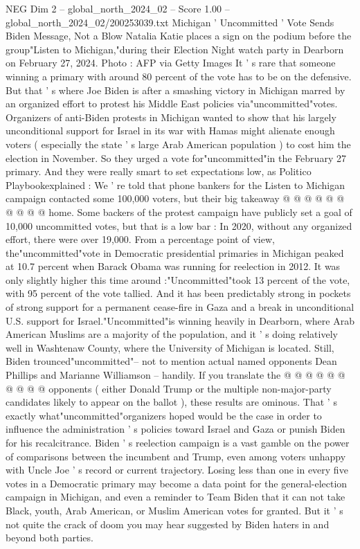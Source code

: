 \begin{textsample}{NEG Dim 2 – global\_north\_2024\_02 – Score 1.00 – global\_north\_2024\_02/200253039.txt}  \label{ex:f2_neg_179}
Michigan ' Uncommitted ' Vote Sends Biden Message, Not a Blow Natalia Katie places a sign on the podium before the group"Listen to Michigan,"during their Election Night watch party in Dearborn on February 27, 2024.
Photo : AFP via Getty Images It ' s rare that someone winning a primary with around 80 percent of the vote has to be on the defensive.
But that ' s where Joe Biden is after a smashing victory in Michigan marred by an organized effort to protest his Middle East policies via"uncommitted"votes.
Organizers of anti-Biden protests in Michigan wanted to show that his largely unconditional support for Israel in its war with Hamas might alienate enough voters ( especially the state ' s large Arab American population ) to cost him the election in November.
So they urged a vote for"uncommitted"in the February 27 primary.
And they were really smart to set expectations low, as Politico Playbookexplained : We ' re told that phone bankers for the Listen to Michigan campaign contacted some 100,000 voters, but their big takeaway @ @ @ @ @ @ @ @ @ @ home.
Some backers of the protest campaign have publicly set a goal of 10,000 uncommitted votes, but that is a low bar : In 2020, without any organized effort, there were over 19,000.
From a percentage point of view, the"uncommitted"vote in Democratic presidential primaries in Michigan peaked at 10.7 percent when Barack Obama was running for reelection in 2012.
It was only slightly higher this time around :"Uncommitted"took 13 percent of the vote, with 95 percent of the vote tallied.
And it has been predictably strong in pockets of strong support for a permanent cease-fire in Gaza and a break in unconditional U.S. support for Israel."Uncommitted"is winning heavily in Dearborn, where Arab American Muslims are a majority of the population, and it ' s doing relatively well in Washtenaw County, where the University of Michigan is located.
Still, Biden trounced"uncommitted"-- not to mention actual named opponents Dean Phillips and Marianne Williamson -- handily.
If you translate the @ @ @ @ @ @ @ @ @ @ opponents ( either Donald Trump or the multiple non-major-party candidates likely to appear on the ballot ), these results are ominous.
That ' s exactly what"uncommitted"organizers hoped would be the case in order to influence the administration ' s policies toward Israel and Gaza or punish Biden for his recalcitrance.
Biden ' s reelection campaign is a vast gamble on the power of comparisons between the incumbent and Trump, even among voters unhappy with Uncle Joe ' s record or current trajectory.
Losing less than one in every five votes in a Democratic primary may become a data point for the general-election campaign in Michigan, and even a reminder to Team Biden that it can not take Black, youth, Arab American, or Muslim American votes for granted.
But it ' s not quite the crack of doom you may hear suggested by Biden haters in and beyond both parties.

\end{textsample}
